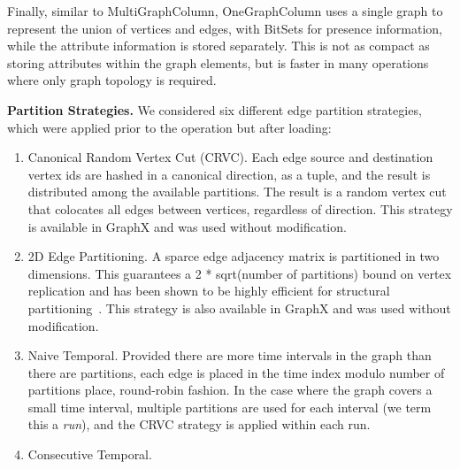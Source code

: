 Finally, similar to MultiGraphColumn, OneGraphColumn uses a single
graph to represent the union of vertices and edges, with BitSets for
presence information, while the attribute information is stored
separately.  This is not as compact as storing attributes within the
graph elements, but is faster in many operations where only graph
topology is required.

{\bf Partition Strategies.}  We considered six different edge
partition strategies, which were applied prior to the operation but
after loading:
\begin{enumerate}
\item Canonical Random Vertex Cut (CRVC).  Each edge source and destination
  vertex ids are hashed in a canonical direction, as a tuple, and the
  result is distributed among the available partitions.  The result is
  a random vertex cut that colocates all edges between vertices,
  regardless of direction.  This strategy is available in GraphX and
  was used without modification.
\item 2D Edge Partitioning.  A sparce edge adjacency matrix is
  partitioned in two dimensions.  This guarantees a 2 * sqrt(number of
  partitions) bound on vertex replication and has been shown to be
  highly efficient for structural partitioning~\cite{}.  This strategy
  is also available in GraphX and was used without modification.
\item Naive Temporal.  Provided there are more time intervals in the
  graph than there are partitions, each edge is placed in the time
  index modulo number of partitions place, round-robin fashion.  In
  the case where the graph covers a small time interval, multiple
  partitions are used for each interval (we term this a {\em run}),
  and the CRVC strategy is applied within each run.
\item Consecutive Temporal.  
\end{enumerate}
